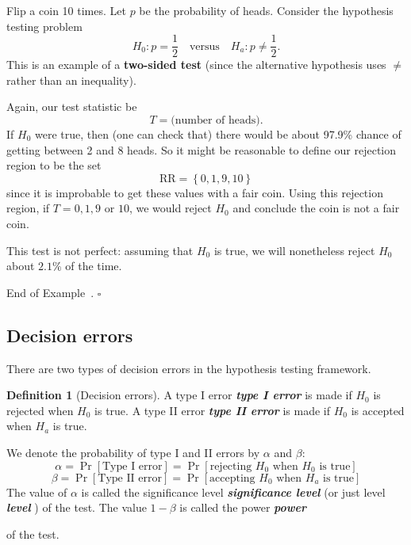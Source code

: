 \documentclass[10pt]{article}
\theoremstyle{definition}
\newtheorem{definition}[theorem]{Definition}
\newtheorem{example}[theorem]{Example}
\renewenvironment{example}
{\begin{oldexample}}
  {\par\smallskip\hfill   End of Example~\theexample. $\square$    \par\end{oldexample}}
\newcommand{\1}[1]{\textbf{1}_{\left[#1\right]}} %
\def\P{\mathbb{P}} %
\DeclareRobustCommand{\demph}[1]{%
  \ifmmode
  {\color{Blue}#1}%
  \else
  {\color{Blue}\bfseries\slshape #1}%
  \fi
}
\begin{document}
\begin{example}[Two-sided test]
  \label{ex:two-sided-test}
  Flip a coin 10 times. Let $p$ be the probability of heads. Consider the
  hypothesis testing problem
  \begin{equation*}
    H_{0}: p = \frac{1}{2} \quad \text{versus} \quad H_{a}: p\neq \frac{1}{2}.
  \end{equation*}
  This is an example of a \textbf{two-sided test} (since the alternative
  hypothesis uses $\neq$ rather than an inequality).

  Again, our test statistic be
  \begin{equation*}
    T = \text{(number of heads)}.
  \end{equation*}
  If $H_{0}$ were true, then (one can check that) there would be about 97.9\%
  chance of getting between 2 and 8 heads. So it might be reasonable to define
  our rejection region to be the set
  \begin{equation*}
    \text{RR} = \left\{0,1,9,10\right\}
  \end{equation*}
  since it is improbable to get these values with a fair coin. Using this
  rejection region, if $T=0,1,9$ or $10$, we would reject $H_{0}$ and conclude
  the coin is not a fair coin.

  This test is not perfect: assuming that $H_{0}$ is true, we will nonetheless
  reject $H_{0}$ about $2.1\%$ of the time.
\end{example}




\subsection{Decision errors}
There are two types of decision errors in the hypothesis testing framework.

\begin{definition}[Decision errors]
  \label{def:decision-errors}
  A \demph{type I error} is made if $H_{0}$ is rejected when $H_{0}$ is true. A
  \demph{type II error} is made if $H_{0}$ is accepted when $H_{a}$ is true.

  We denote the probability of type I and II errors by $\alpha$ and $\beta$:
  \begin{equation*}
    \alpha = \Pr \left[ \text{Type I error} \right] = \Pr\left[
      \text{rejecting $H_{0}$ when $H_{0}$ is true}\right]
  \end{equation*}
  \begin{equation*}
    \beta = \Pr \left[ \text{Type II error} \right] = \Pr \left[
      \text{accepting $H_{0}$ when $H_{a}$ is true} \right] 
  \end{equation*}
  The value of $\alpha$ is called the \demph{significance level} (or just
  \demph{level}) of the test. The value $1-\beta$ is called the \demph{power}
  of the test.
\end{definition}
\end{document}
